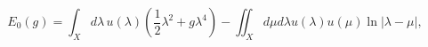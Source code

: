 \begin{equation}
    E_0(g)=\int_{X}d\lambda\, u(\lambda)\left(\frac{1}{2}\lambda^2+
    g\lambda^4\right)-\iint_{X}d\mu d\lambda u(\lambda) u(\mu)
    \ln|\lambda-\mu|,
\end{equation}

